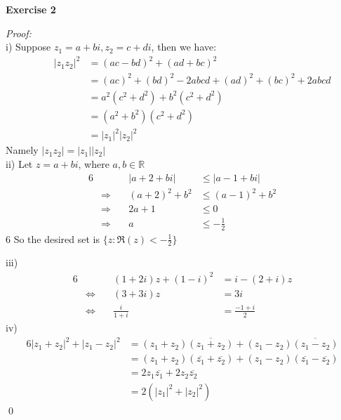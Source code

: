 \documentclass[12pt]{article}
\begin{document}
\textbf{Exercise 2}\par
\textit{Proof: }\\i) Suppose $z_1=a+bi, z_2=c+di$, then we have:
\begin{align*}
\quad\quad|z_1z_2|^2&=(ac-bd)^2+(ad+bc)^2\\
&={(ac)}^2+{(bd)}^2-2abcd+{(ad)}^2+{(bc)}^2+2abcd\\
&=a^2(c^2+d^2)+b^2(c^2+d^2)\\
&=(a^2+b^2)(c^2+d^2)\\
&={|z_1|}^2{|z_2|}^2
\end{align*}
Namely $|z_1z_2|=|z_1||z_2|$\\
ii) Let $z=a+bi$, where $a,b\in\mathbb{R}$
\begin{alignat*}{6}
&&|a+2+bi|&\leq|a-1+bi|\\
&\Longrightarrow\quad&{(a+2)}^2+b^2&\leq{(a-1)}^2+b^2\\
&\Longrightarrow&2a+1&\leq0\\
&\Longrightarrow& a&\leq-\frac{1}{2}
\end{alignat*}{6}
So the desired set is $\{z:\Re(z)<-\frac{1}{2}\}$\par
iii) \begin{alignat*}{6}
&    &(1+2i)z+(1-i)^2&=i-(2+i)z\\
&\iff\quad		  &(3+3i)z&=3i\\
&\iff     &\frac{i}{1+i}&=\frac{-1+i}{2}
\end{alignat*}
iv)\begin{alignat*}{6}
{|z_1+z_2|}^2+{|z_1-z_2|}^2
&=(z_1+z_2)\overline{(z_1+z_2)}+(z_1-z_2)\overline{(z_1-z_2)}\\
&=(z_1+z_2)(\overline{z_1}+\overline{z_2})+(z_1-z_2)(\overline{z_1}-\overline{z_2})\\
&=2z_1\overline{z_1}+2z_2\overline{z_2}\\
&=2\left({|z_1|}^2+{|z_2|}^2\right)
\end{alignat*}
\qed
\par
\end{document}
